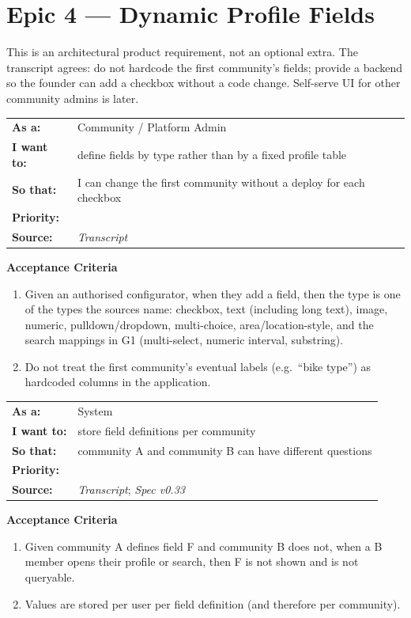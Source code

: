 \documentclass[11pt,a4paper]{article}
\makeatletter
\newcommand{\priPzero}{\colorbox{p0}{\makebox[4.6em]{\textcolor{white}{\scriptsize\bfseries P0 V1}}}}
\newcommand{\srcSpec}{\textit{Spec v0.33}}
\newcommand{\srcTx}{\textit{Transcript}}
\newenvironment{story}[1]{%
  \Needspace{10\baselineskip}%
  \vspace{0.7em}%
  \noindent
  \colorbox{navy}{\makebox[\dimexpr\textwidth-2\fboxsep\relax][l]{\textcolor{white}{\bfseries\ #1}}}%
  \par\vspace{0.35em}%
}{\par\vspace{0.55em}}
\newcommand{\storymeta}[5]{%
  \noindent
  \begin{tabularx}{\textwidth}{@{}>{\bfseries}l X@{}}
    As a: & #1 \\
    I want to: & #2 \\
    So that: & #3 \\
    Priority: & #4 \\
    Source: & #5 \\
  \end{tabularx}
  \par\vspace{0.3em}
}
\newcommand{\achead}{\noindent\textbf{Acceptance Criteria}\par}
\makeatother
\begin{document}
\section{Epic 4 --- Dynamic Profile Fields}
This is an architectural product requirement, not an optional extra. The transcript agrees: do not hardcode the first community's fields; provide a backend so the founder can add a checkbox without a code change. Self-serve UI for other community admins is later.

\begin{story}{DYN-001 --- Field types supported by the backend}
\storymeta{Community / Platform Admin}{define fields by type rather than by a fixed profile table}{I can change the first community without a deploy for each checkbox}{\priPzero}{\srcTx}
\achead
\begin{enumerate}
  \item Given an authorised configurator, when they add a field, then the type is one of the types the sources name: checkbox, text (including long text), image, numeric, pulldown/dropdown, multi-choice, area/location-style, and the search mappings in G1 (multi-select, numeric interval, substring).
  \item Do not treat the first community's eventual labels (e.g.\ ``bike type'') as hardcoded columns in the application.
\end{enumerate}
\end{story}

\begin{story}{DYN-002 --- Schema is per community}
\storymeta{System}{store field definitions per community}{community A and community B can have different questions}{\priPzero}{\srcTx; \srcSpec}
\achead
\begin{enumerate}
  \item Given community A defines field F and community B does not, when a B member opens their profile or search, then F is not shown and is not queryable.
  \item Values are stored per user per field definition (and therefore per community).
\end{enumerate}
\end{story}
\end{document}
